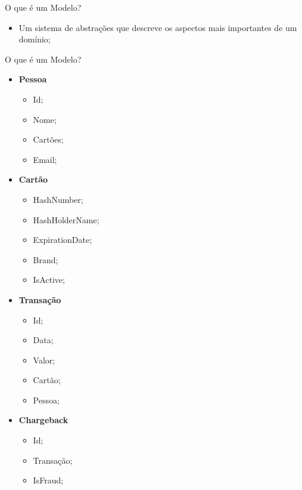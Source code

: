 \documentclass[aspectratio=169]{beamer}
\begin{document}
\begin{frame}{O que é um Modelo?}
	\begin{itemize}	
		\item Um sistema de abstrações que descreve os aspectos mais importantes de um domínio;
	\end{itemize}
\end{frame}

\begin{frame}{O que é um Modelo?}	
	\begin{multicols}{2}		
		\begin{itemize}	
			\item \textbf{Pessoa}
			\begin{itemize}	
				\item Id;
				\item Nome;
				\item Cartões;
				\item Email;
			\end{itemize}
		\end{itemize}
		\begin{itemize}	
			\item \textbf{Cartão}
			\begin{itemize}	
				\item HashNumber;
				\item HashHolderName;
				\item ExpirationDate;
				\item Brand;
				\item IsActive;
			\end{itemize}
		\end{itemize}
		\begin{itemize}	
			\item \textbf{Transação}
			\begin{itemize}	
				\item Id;
				\item Data;
				\item Valor;
				\item Cartão;
				\item Pessoa;
			\end{itemize}
		\end{itemize}
		\begin{itemize}	
			\item \textbf{Chargeback}
			\begin{itemize}	
				\item Id;
				\item Transação;
				\item IsFraud;
			\end{itemize}
		\end{itemize}
	\end{multicols}
\end{frame}
\end{document}
